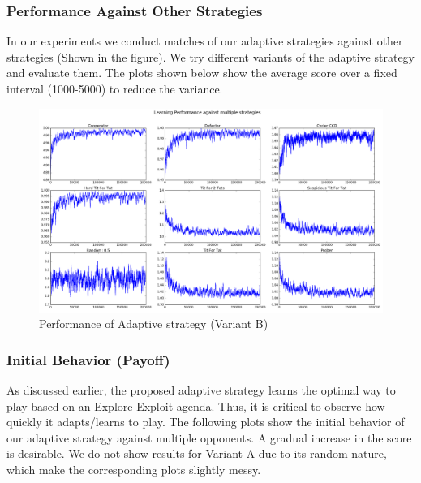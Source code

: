 \documentclass[a4paper]{article}
\begin{document}
	\subsubsection{Performance Against Other Strategies}
	
	In our experiments we conduct matches of our adaptive strategies against other strategies (Shown in the figure). We try different variants of the adaptive strategy and evaluate them. The plots shown below show the average score over a fixed interval (1000-5000) to reduce the variance. 
	
	\begin{figure}[H]
	\centering
	\includegraphics[width=\textwidth]{learnerB.png}
	\caption{{Performance of Adaptive strategy (Variant B)}}
	\end{figure}

	\subsubsection{Initial Behavior (Payoff)}

	As discussed earlier, the proposed adaptive strategy learns the optimal way to play based on an Explore-Exploit agenda. Thus, it is critical to observe how quickly it adapts/learns to play. The following plots show the initial behavior of our adaptive strategy against multiple opponents. A gradual increase in the score is desirable. We do not show results for Variant A due to its random nature, which make the corresponding plots slightly messy.\\
\end{document}
